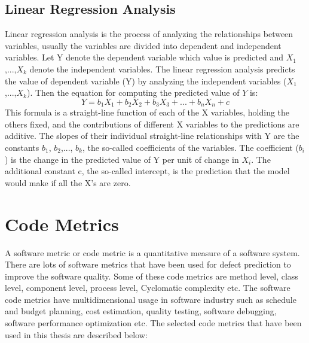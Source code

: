 \documentclass[12pt]{report}
\begin{document}

\subsection{Linear Regression Analysis}
Linear regression analysis is the process of analyzing the relationships between variables, usually the variables are divided into dependent and independent variables.  Let Y denote the dependent variable which value is predicted and $X_{1}$,...,$X_{k}$ denote the independent variables. The linear regression analysis predicts the value of dependent variable (Y) by analyzing the independent variables ($X_{1}$,...,$X_{k}$). Then the equation for computing the predicted value of $Y$ is:
\begin{equation}
\label{eq:linear_regression_analysis}
 Y=b_{1}X_{1}+b_{2}X_{2}+b_{3}X_{3}+...+b_{n}X_{n}+c
\end{equation}
This formula is a straight-line function of each of the X variables, holding the others fixed, and the contributions of different X variables to the predictions are additive. The slopes of their individual straight-line relationships with Y are the constants $b_{1}$, $b_{2}$,..., $b_{k}$, the so-called coefficients of the variables. The coefficient ($b_{i}$) is the change in the predicted value of Y per unit of change in $X_{i}$. The additional constant c, the so-called intercept, is the prediction that the model would make if all the X’s are zero. 





\section{Code Metrics}
\label{software_code_metrics_description}
A software metric or code metric is a quantitative measure of a software system. There are lots of software metrics that have been used for defect prediction to improve the software quality. Some of these code metrics are method level, class level, component level, process level, Cyclomatic complexity etc. The software code metrics have multidimensional usage in software industry such as schedule and budget planning, cost estimation, quality testing, software debugging, software performance optimization etc. The selected code metrics that have been used in this thesis are described below:
\end{document}
